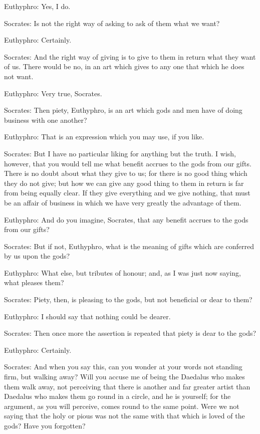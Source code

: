Euthyphro: Yes, I do.

Socrates: Is not the right way of asking to ask of them what we want?

Euthyphro: Certainly.

Socrates: And the right way of giving is to give to them in return what they want of us. There would be no, in an art which gives to any one that which he does not want.

Euthyphro: Very true, Socrates.

Socrates: Then piety, Euthyphro, is an art which gods and men have of doing business with one another?

Euthyphro: That is an expression which you may use, if you like.

Socrates: But I have no particular liking for anything but the truth. I wish, however, that you would tell me what benefit accrues to the gods from our gifts. There is no doubt about what they give to us; for there is no good thing which they do not give; but how we can give any good thing to them in return is far from being equally clear. If they give everything and we give nothing, that must be an affair of business in which we have very greatly the advantage of them.

Euthyphro: And do you imagine, Socrates, that any benefit accrues to the gods from our gifts?

Socrates: But if not, Euthyphro, what is the meaning of gifts which are conferred by us upon the gods?

Euthyphro: What else, but tributes of honour; and, as I was just now saying, what pleases them?

Socrates: Piety, then, is pleasing to the gods, but not beneficial or dear to them?

Euthyphro: I should say that nothing could be dearer.

Socrates: Then once more the assertion is repeated that piety is dear to the gods?

Euthyphro: Certainly.

Socrates: And when you say this, can you wonder at your words not standing firm, but walking away? Will you accuse me of being the Daedalus who makes them walk away, not perceiving that there is another and far greater artist than Daedalus who makes them go round in a circle, and he is yourself; for the argument, as you will perceive, comes round to the same point. Were we not saying that the holy or pious was not the same with that which is loved of the gods? Have you forgotten?

